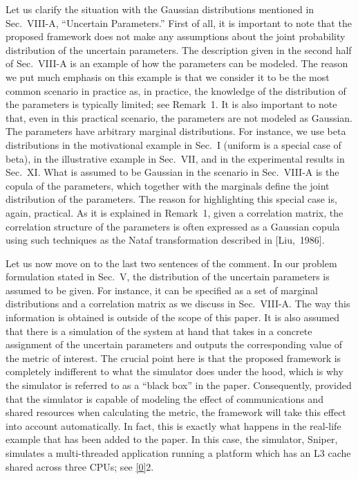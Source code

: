 \begin{authors}
Let us clarify the situation with the Gaussian distributions mentioned in
Sec.~VIII-A, ``Uncertain Parameters.'' First of all, it is important to note
that the proposed framework does not make any assumptions about the joint
probability distribution of the uncertain parameters. The description given in
the second half of Sec.~VIII-A is an example of how the parameters can be
modeled. The reason we put much emphasis on this example is that we consider it
to be the most common scenario in practice as, in practice, the knowledge of the
distribution of the parameters is typically limited; see Remark~1. It is also
important to note that, even in this practical scenario, the parameters are not
modeled as Gaussian. The parameters have arbitrary marginal distributions. For
instance, we use beta distributions in the motivational example in Sec.~I
(uniform is a special case of beta), in the illustrative example in Sec.~VII,
and in the experimental results in Sec.~XI. What is assumed to be Gaussian in
the scenario in Sec.~VIII-A is the copula of the parameters, which together with
the marginals define the joint distribution of the parameters. The reason for
highlighting this special case is, again, practical. As it is explained in
Remark~1, given a correlation matrix, the correlation structure of the
parameters is often expressed as a Gaussian copula using such techniques as the
Nataf transformation described in [Liu,~1986].

Let us now move on to the last two sentences of the comment. In our problem
formulation stated in Sec.~V, the distribution of the uncertain parameters is
assumed to be given. For instance, it can be specified as a set of marginal
distributions and a correlation matrix as we discuss in Sec.~VIII-A. The way
this information is obtained is outside of the scope of this paper. It is also
assumed that there is a simulation of the system at hand that takes in a
concrete assignment of the uncertain parameters and outputs the corresponding
value of the metric of interest. The crucial point here is that the proposed
framework is completely indifferent to what the simulator does under the hood,
which is why the simulator is referred to as a ``black box'' in the paper.
Consequently, provided that the simulator is capable of modeling the effect of
communications and shared resources when calculating the metric, the framework
will take this effect into account automatically. In fact, this is exactly what
happens in the real-life example that has been added to the paper. In this case,
the simulator, Sniper, simulates a multi-threaded application running a platform
which has an L3 cache shared across three CPUs; see \cref{0}{2}.

\begin{actions}

\end{actions}
\end{authors}
